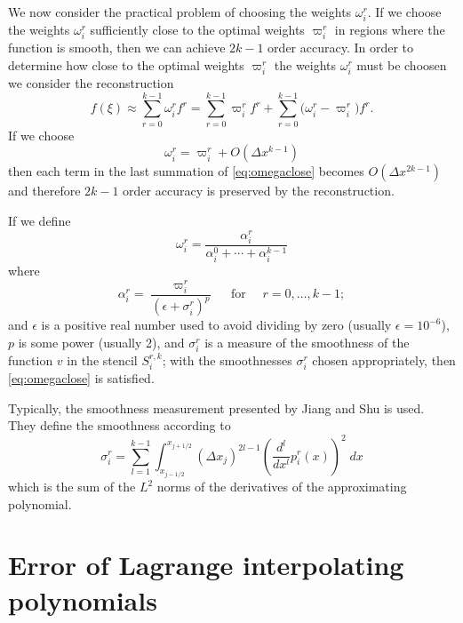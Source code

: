 \documentclass{article}
\newcommand{\for}[0]{\quad \text{ for } \quad}
\newcommand{\xlj}[0]{x_{j-1/2}}
\newcommand{\xrj}[0]{x_{j+1/2}}
\numberwithin{equation}{section}
\begin{document}
We now consider the practical problem of choosing the weights
$\omega_i^r$.  If we choose the weights $\omega_i^r$ sufficiently
close to the optimal weights $\varpi_i^r$ in regions where the
function is smooth, then we can achieve $2k-1$ order accuracy.  In
order to determine how close to the optimal weights $\varpi_i^r$ the
weights $\omega_i^r$ must be choosen we consider the reconstruction
\begin{equation}
  \label{eq:omegacloseeqn}
  f(\xi) \approx \sum_{r=0}^{k-1} \omega_i^r f^r
    = \sum_{r=0}^{k-1} \varpi_i^r f^r
    + \sum_{r=0}^{k-1} \bigl( \omega_i^r - \varpi_i^r \bigr) f^r.
\end{equation}
If we choose
\begin{equation}
  \label{eq:omegaclose}
  \omega_i^r = \varpi_i^r + O(\Delta x^{k-1})
\end{equation}
then each term in the last summation of \eqref{eq:omegaclose} becomes
$O(\Delta x^{2k-1})$ and therefore $2k-1$ order accuracy is preserved
by the reconstruction.

If we define
\begin{equation}
  \label{eq:omega}
  \omega_i^r = \frac{\alpha_i^r}{\alpha_i^0 + \cdots + \alpha_i^{k-1}}
\end{equation}
where
\begin{equation}
  \label{eq:alpha}
  \alpha_i^r = \frac{\varpi_i^r}{(\epsilon + \sigma_i^r)^p} \for r = 0, \ldots, k-1;
\end{equation}
and $\epsilon$ is a positive real number used to avoid dividing by
zero (usually $\epsilon = 10^{-6}$), $p$ is some power (usually 2),
and $\sigma_i^r$ is a measure of the smoothness of the function $v$ in
the stencil $S^{r,k}_i$; with the smoothnesses $\sigma_i^r$ chosen
appropriately, then \eqref{eq:omegaclose} is satisfied.

Typically, the smoothness measurement presented by Jiang and Shu is
used.  They define the smoothness according to
\begin{equation}
  \label{eq:sigma}
  \sigma_i^r = \sum_{l=1}^{k-1} \int_{\xlj}^{\xrj} (\Delta x_j)^{2l-1} \left( \frac{d^l}{dx^l} p_i^r(x)  \right)^2 \;dx
\end{equation}
which is the sum of the $L^2$ norms of the derivatives of the
approximating polynomial.



\newpage
\appendix
\section{Error of Lagrange interpolating polynomials}
\label{app:lagrange}
\end{document}
